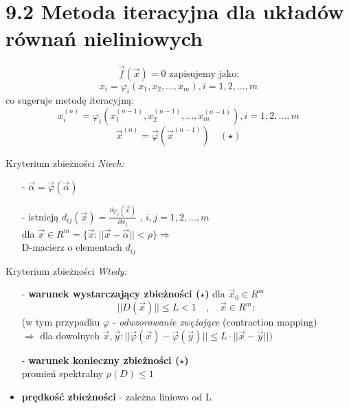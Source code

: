 \section{9.2 Metoda iteracyjna dla układów równań nieliniowych}

\begin{frame}{}
  $$\boxed{\overrightarrow{f}(\overrightarrow{x})=0}\text{ zapisujemy jako:}$$
  $$x_i=\varphi_i(x_1,x_2,...,x_m) , i=1,2,...,m$$
  co sugeruje metodę iteracyjną:
  $$x_i^{(n)}=\varphi_i(x_1^{(n-1)},x_2^{(n-1)},...,x_m^{(n-1)}) , i=1,2,...,m$$
  $$\boxed{\overrightarrow{x}^{(n)}=\overrightarrow{\varphi}(\overrightarrow{x}^{(n-1)})}\quad(\star)$$
\end{frame}

\begin{frame}{}
  \begin{block}{Kryterium zbieżności}
  	\emph{Niech:}
    \begin{itemize}
      \item[-] $\overrightarrow{\alpha}=\overrightarrow{\varphi}(\overrightarrow{\alpha})$
      \item[-] istnieją $d_{ij}(\overrightarrow{x})=\frac{\partial\varphi_i(\overrightarrow{x})}{\partial x_j}$ , $i,j=1,2,...,m$\\
      dla $\overrightarrow{x}\in R^m=\{\overrightarrow{x}:||\overrightarrow{x}-\overrightarrow{\alpha}||<\rho\} \Rightarrow$\\
      D-macierz o elementach $d_{ij}$
    \end{itemize}
  \end{block}
\end{frame}

\begin{frame}{}
  \begin{block}{Kryterium zbieżności}
    \emph{Wtedy:}
    \begin{itemize}
      \item[-] \textbf{warunek wystarczający zbieżności ($\star$)} dla $\overrightarrow{x}_0\in R^m$\\
      $$||D(\overrightarrow{x})||\leq L<1\quad,\quad\overrightarrow{x}\in R^m:$$
      (w tym przypadku $\varphi$ - \emph{odwzorowanie zwężające} (contraction mapping)\\ $\Rightarrow$ dla dowolnych $\overrightarrow{x},\overrightarrow{y}: ||\overrightarrow{\varphi}(\overrightarrow{x})-\overrightarrow{\varphi}(\overrightarrow{y})||\leq L \cdot ||\overrightarrow{x}-\overrightarrow{y}||)$
      \item[-] \textbf{warunek konieczny zbieżności ($\star$)}\\
      promień spektralny $\rho(D)\leq 1$
      \item \textbf{prędkość zbieżności} - zależna liniowo od L
    \end{itemize}
  \end{block}
\end{frame}
